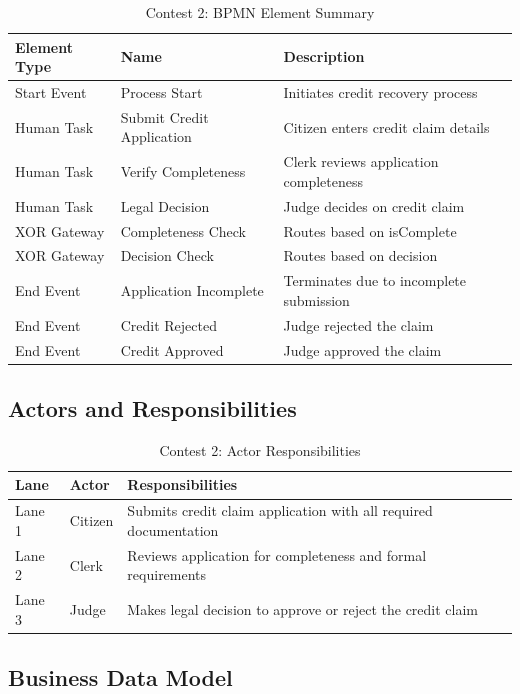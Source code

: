 \documentclass[12pt,a4paper]{article}
\begin{document}
\begin{table}[H]
\centering
\caption{Contest 2: BPMN Element Summary}
\begin{tabular}{llp{6cm}}
\toprule
\textbf{Element Type} & \textbf{Name} & \textbf{Description} \\
\midrule
Start Event & Process Start & Initiates credit recovery process \\
Human Task & Submit Credit Application & Citizen enters credit claim details \\
Human Task & Verify Completeness & Clerk reviews application completeness \\
Human Task & Legal Decision & Judge decides on credit claim \\
XOR Gateway & Completeness Check & Routes based on isComplete \\
XOR Gateway & Decision Check & Routes based on decision \\
End Event & Application Incomplete & Terminates due to incomplete submission \\
End Event & Credit Rejected & Judge rejected the claim \\
End Event & Credit Approved & Judge approved the claim \\
\bottomrule
\end{tabular}
\label{tab:contest2_elements}
\end{table}

\subsection{Actors and Responsibilities}

\begin{table}[H]
\centering
\caption{Contest 2: Actor Responsibilities}
\begin{tabular}{llp{6cm}}
\toprule
\textbf{Lane} & \textbf{Actor} & \textbf{Responsibilities} \\
\midrule
Lane 1 & Citizen & Submits credit claim application with all required documentation \\
Lane 2 & Clerk & Reviews application for completeness and formal requirements \\
Lane 3 & Judge & Makes legal decision to approve or reject the credit claim \\
\bottomrule
\end{tabular}
\label{tab:contest2_actors}
\end{table}

\subsection{Business Data Model}
\end{document}
